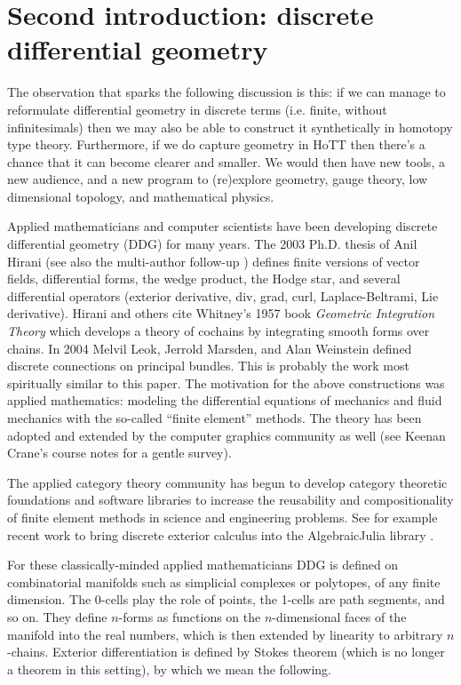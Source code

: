 \documentclass[12pt]{article}
\begin{document}
\section{Second introduction: discrete differential geometry}

The observation that sparks the following discussion is this: if we can manage to reformulate differential geometry in discrete terms (i.e. finite, without infinitesimals) then we may also be able to construct it synthetically in homotopy type theory. Furthermore, if we do capture geometry in HoTT then there's a chance that it can become clearer and smaller. We would then have new tools, a new audience, and a new program to (re)explore geometry, gauge theory, low dimensional topology, and mathematical physics.

Applied mathematicians and computer scientists have been developing discrete differential geometry (DDG) for many years. The 2003 Ph.D. thesis of Anil Hirani \cite{hiranidec} (see also the multi-author follow-up \cite{desbrundec}) defines finite versions of vector fields, differential forms, the wedge product, the Hodge star, and several differential operators (exterior derivative, div, grad, curl, Laplace-Beltrami, Lie derivative). Hirani and others cite Whitney's 1957 book \emph{Geometric Integration Theory}\cite{whitney1957} which develops a theory of cochains by integrating smooth forms over chains. In 2004 Melvil Leok, Jerrold Marsden, and Alan Weinstein \cite{leok} defined discrete connections on principal bundles. This is probably the work most spiritually similar to this paper. The motivation for the above constructions was applied mathematics: modeling the differential equations of mechanics and fluid mechanics with the so-called ``finite element'' methods. The theory has been adopted and extended by the computer graphics community as well (see Keenan Crane's course notes \cite{crane_ddg} for a gentle survey).

The applied category theory community has begun to develop category theoretic foundations and software libraries to increase the reusability and compositionality of finite element methods in science and engineering problems. See for example recent work to bring discrete exterior calculus into the AlgebraicJulia library \cite{morris_decapodes} \cite{patterson_diffeq}.

For these classically-minded applied mathematicians DDG is defined on combinatorial manifolds such as simplicial complexes or polytopes, of any finite dimension. The 0-cells play the role of points, the 1-cells are path segments, and so on. They define \( n \)-forms as functions on the \( n \)-dimensional faces of the manifold into the real numbers, which is then extended by linearity to arbitrary \( n \)-chains. Exterior differentiation is defined by Stokes theorem (which is no longer a theorem in this setting), by which we mean the following. 
\end{document}
